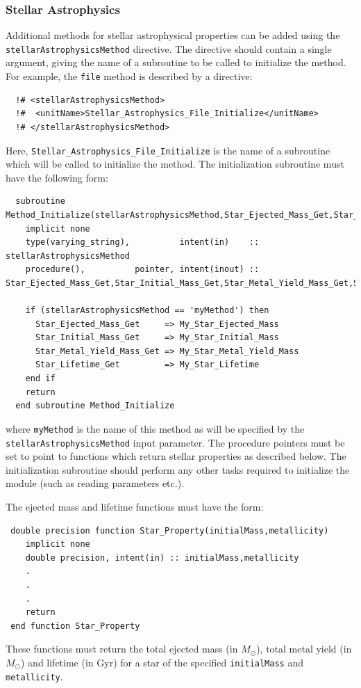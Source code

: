\subsubsection{Stellar Astrophysics}

Additional methods for stellar astrophysical properties can be added using the {\tt stellarAstrophysicsMethod} directive. The directive should contain a single argument, giving the name of a subroutine to be called to initialize the method. For example, the {\tt file} method is described by a directive:
\begin{verbatim}
  !# <stellarAstrophysicsMethod>
  !#  <unitName>Stellar_Astrophysics_File_Initialize</unitName>
  !# </stellarAstrophysicsMethod>
\end{verbatim}
Here, {\tt Stellar\_Astrophysics\_File\_Initialize} is the name of a subroutine which will be called to initialize the method. The initialization subroutine must have the following form:
\begin{verbatim}
  subroutine Method_Initialize(stellarAstrophysicsMethod,Star_Ejected_Mass_Get,Star_Initial_Mass_Get,Star_Metal_Yield_Mass_Get,Star_Lifetime_Get)
    implicit none
    type(varying_string),          intent(in)    :: stellarAstrophysicsMethod
    procedure(),          pointer, intent(inout) :: Star_Ejected_Mass_Get,Star_Initial_Mass_Get,Star_Metal_Yield_Mass_Get,Star_Lifetime_Get
    
    if (stellarAstrophysicsMethod == 'myMethod') then
      Star_Ejected_Mass_Get     => My_Star_Ejected_Mass
      Star_Initial_Mass_Get     => My_Star_Initial_Mass
      Star_Metal_Yield_Mass_Get => My_Star_Metal_Yield_Mass
      Star_Lifetime_Get         => My_Star_Lifetime
    end if
    return
  end subroutine Method_Initialize
\end{verbatim}
where {\tt myMethod} is the name of this method as will be specified by the {\tt stellarAstrophysicsMethod} input parameter. The procedure pointers must be set to point to functions which return stellar properties as described below. The initialization subroutine should perform any other tasks required to initialize the module (such as reading parameters etc.).

The ejected mass and lifetime functions must have the form:
\begin{verbatim}
 double precision function Star_Property(initialMass,metallicity)
    implicit none
    double precision, intent(in) :: initialMass,metallicity
    .
    .
    .
    return
 end function Star_Property
\end{verbatim}
These functions must return the total ejected mass (in $M_\odot$), total metal yield (in $M_\odot$) and lifetime (in Gyr) for a star of the specified {\tt initialMass} and {\tt metallicity}.

